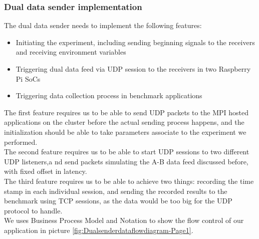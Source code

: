 \documentclass[11pt,openright,a4paper]{report}
\begin{document}
\subsubsection{Dual data sender implementation}
The dual data sender needs to implement the following features:
\begin{itemize}
	\item Initiating the experiment, including sending beginning signals to the receivers and receiving environment variables
	\item Triggering dual data feed via UDP session to the receivers in two Raspberry Pi SoCs
	\item Triggering data collection process in benchmark applications
\end{itemize}
The first feature requires us to be able to send UDP packets to the MPI hosted applications on the cluster before the actual sending process happens, and the initialization should be able to take parameters associate to the experiment we performed. \\
The second feature requires us to be able to start UDP sessions to two different UDP listeners,a nd send packets simulating the A-B data feed discussed before, with fixed offset in latency.\\
The third feature requires us to be able to achieve two things: recording the time stamp in each individual session, and sending the recorded results to the benchmark using TCP sessions, as the data would be too big for the UDP protocol to handle.\\
We uses Business Process Model and Notation to show the flow control of our application\cite{dijkman2011business} in picture \ref{fig:Dualsenderdataflowdiagram-Page1}.
\end{document}
